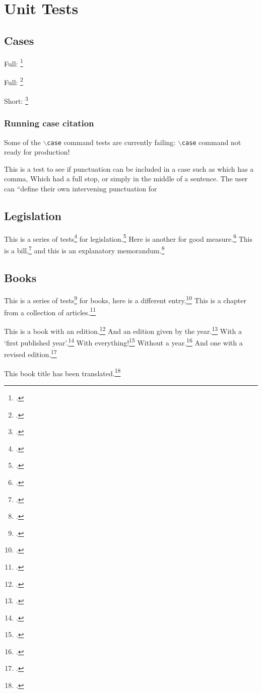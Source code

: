 \documentclass[titlepage,11pt]{lawessay}
\begin{document}
\clearpage
\section{Unit Tests}
\subsection{Cases}
\noindent Full:  \cite[23]{Amery}\footcite[23]{Amery}

\noindent Full:  \cite{Hickie}\footcite{Hickie}

\noindent Short: \cite[25]{Amery}\footcite[25]{Amery}

\subsubsection{Running case citation}
Some of the {\tt $\backslash$case} command tests are currently failing: {\tt $\backslash$case} command not ready for production!

This is a test to see if punctuation can be included in a case such as 
which has a comma,  Which had a full stop, or simply  in the middle of a sentence.
The user can ``define their own intervening punctuation for 

\clearpage
\subsection{Legislation}
This is a series of tests\footcite{EOA} for legislation.\footcite[s 2]{SDA} Here is another for good measure.\footcite[ss 23, 25]{EOA}
This is a bill,\footcite{EOB}
and this is an explanatory memorandum.\footcite{EOA-exp}

\clearpage
\subsection{Books}
This is a series of tests\footcite{Broderick08} for books, 
here is a different entry.\footcite[23, 25]{Dearing07}
This is a chapter from a collection of articles.\footcite{Spears08}

This is a book with an edition.\footcite{Gambles06}
And an edition given by the year.\footcite{Hardill02}
With a `first published year'.\footcite{Jaumotte04}
With everything!\footcite{Knijn08}
Without a year.\footcite{Korabik08}
And one with a revised edition.\footcite{Kossek05}

This book title has been translated.\footcite[32]{Merz04}
\end{document}
